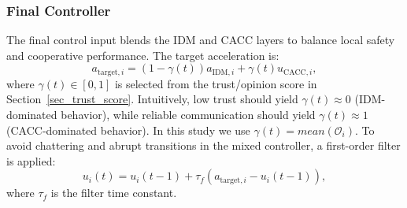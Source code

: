 \subsubsection{Final Controller}
The final control input blends the IDM and CACC layers to balance local safety and cooperative performance. The target acceleration is:
\begin{equation}
    a_{\text{target},i} = (1 - \gamma(t)) a_{\text{IDM},i} + \gamma(t) u_{\text{CACC},i},
\end{equation}
where \(\gamma(t) \in [0,1]\) is selected from the trust/opinion score in Section~\ref{sec_trust_score}. Intuitively, low trust should yield \(\gamma(t)\approx 0\) (IDM-dominated behavior), 
while reliable communication should yield \(\gamma(t)\approx 1\) (CACC-dominated behavior). In this study we use \(\gamma(t) = mean(\mathcal{O}_i)\).
To avoid chattering and abrupt transitions in the mixed controller, a first-order filter is applied:
\begin{equation}
    u_i(t) = u_i(t-1) + \tau_f (a_{\text{target},i} - u_i(t-1)),
\end{equation}
where $\tau_f$ is the filter time constant. 


